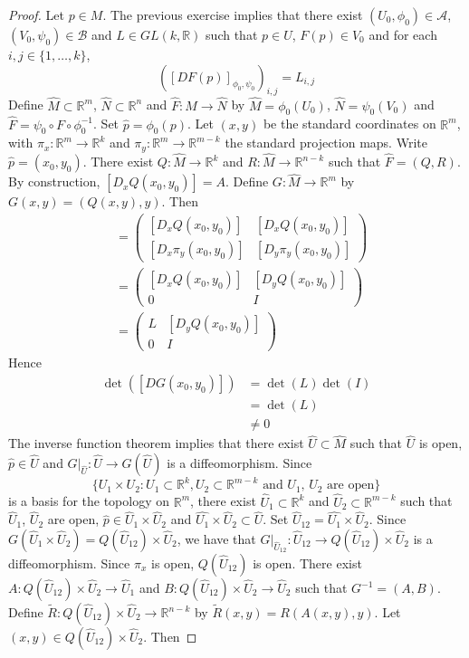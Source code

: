 \documentclass{book}
\theoremstyle{definition}
\newcommand{\R}{\mathbb{R}}
\newcommand{\MA}{\mathcal{A}}
\newcommand{\MB}{\mathcal{B}}
\DeclareMathOperator*{\0}{\mbf{0}}
\DeclareMathOperator*{\1}{\mbf{1}}
\begin{document}
	\begin{proof} Let $p \in M$. The previous exercise implies that there exist $(U_0, \phi_0) \in \MA$, $(V_0, \psi_0) \in \MB$ and $L \in GL(k, \R)$ such that $p \in U$, $F(p) \in V_0$ and for each $i,j \in \{1, \ldots, k\}$, 
		$$([DF(p)]_{\phi_0, \psi_0})_{i,j} = L_{i,j} $$ 
		Define $\hat{M} \subset \R^m$, $\hat{N} \subset \R^n$ and $\hat{F}: \hat{M} \rightarrow \hat{N}$ by $\hat{M} = \phi_0(U_0)$, $\hat{N} = \psi_0(V_0)$ and $\hat{F} = \psi_0 \circ F \circ \phi_0^{-1}$. Set $\hat{p} = \phi_0(p)$. Let $(x, y)$ be the standard coordinates on $\R^m$, with $\pi_x: \R^m \rightarrow \R^k$ and $\pi_y: \R^m \rightarrow \R^{m-k}$ the standard projection maps. Write $\hat{p} = (x_0, y_0)$. There exist $Q: \hat{M} \rightarrow \R^k$ and $R: \hat{M} \rightarrow  \R^{n-k}$ such that $\hat{F} = (Q, R)$. By construction, $[D_xQ(x_0, y_0)] = A$. Define $G: \hat{M} \rightarrow \R^m$ by $G(x, y) = (Q(x, y), y)$. Then
		\begin{align*}
			[D G (x_0, y_0)] 
			& = \begin{pmatrix}
				[D_{x}Q(x_0, y_0)] & [D_{x}Q(x_0, y_0)] \\
				[D_{x} \pi_{y}(x_0, y_0)] &  	[D_{y} \pi_{y}(x_0, y_0) ]
			\end{pmatrix}  \\
			& = 
			\begin{pmatrix}
				[D_{x}Q(x_0, y_0)] & [D_{y}Q(x_0, y_0)] \\
				0 & I 
			\end{pmatrix} \\
			& = 
			\begin{pmatrix}
				L & [D_{y}Q(x_0, y_0)] \\
				0 & I 
			\end{pmatrix} 
		\end{align*}  
		Hence 
		\begin{align*}
			\det([D G (x_0, y_0)]) 
			& = \det(L) \det(I) \\
			& = \det(L) \\
			& \neq 0
		\end{align*}
		The inverse function theorem implies that there exist $\hat{U} \subset \hat{M}$ such that $\hat{U}$ is open, $\hat{p} \in \hat{U}$ and $G|_{\hat{U}}: \hat{U} \rightarrow G(\hat{U})$ is a diffeomorphism. Since 
		$$\{U_1 \times U_2: U_1 \subset \R^k, U_2 \subset \R^{m-k} \text{ and $U_1$, $U_2$ are open} \}$$ 
		is a basis for the topology on $\R^m$, there exist $\hat{U}_1 \subset \R^k$ and $\hat{U}_2 \subset \R^{m-k}$ such that $\hat{U}_1$, $\hat{U}_2$ are open, $\hat{p} \in \hat{U}_1 \times \hat{U}_2$ and $\hat{U_1} \times \hat{U}_2 \subset \hat{U}$. Set $\hat{U}_{12} = \hat{U_1} \times \hat{U}_2$. Since $ G(\hat{U}_1 \times \hat{U}_2) = Q(\hat{U}_{12}) \times \hat{U}_2$, we have that  $G|_{\hat{U}_{12}}: \hat{U}_{12} \rightarrow Q(\hat{U}_{12}) \times \hat{U}_2$ is a diffeomorphism. Since $\pi_x$ is open, $Q(\hat{U}_{12})$ is open. There exist $A: Q(\hat{U}_{12}) \times \hat{U}_2 \rightarrow \hat{U}_1$ and $B: Q(\hat{U}_{12}) \times \hat{U}_2 \rightarrow \hat{U}_2$ such that $G^{-1} = (A, B)$. Define $\tilde{R}: Q(\hat{U}_{12}) \times \hat{U}_2 \rightarrow \R^{n-k}$ by $\tilde{R}(x,y) = R(A(x,y), y)$. Let $(x,y) \in Q(\hat{U}_{12}) \times \hat{U}_2$. Then

\end{proof}
\end{document}
